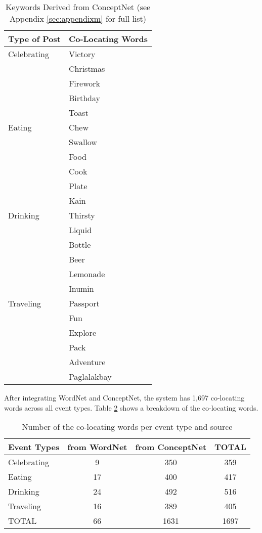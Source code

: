 \begin{table}[ph!]   %
	\centering
	\caption{Keywords Derived from ConceptNet (see Appendix \ref{sec:appendixm} for full list)} \vspace{0.25em}
	\begin{tabular}{|p{1.5in}|p{2in}|} \hline
		\centering Type of Post & Co-Locating Words \\ \hline
		Celebrating 
			& Victory \\ 
			& Christmas \\ 
			& Firework \\ 
			& Birthday \\ 
			& Toast \\\hline
		Eating  
			& Chew \\ 
			& Swallow \\ 
			& Food \\ 
			& Cook \\ 
			& Plate \\ 
			& Kain \\\hline

		Drinking 
			& Thirsty \\ 
			& Liquid \\
			& Bottle \\ 
			& Beer \\ 
			& Lemonade \\ 
			& Inumin \\\hline
		Traveling 
			& Passport \\ 
			& Fun \\ 
			& Explore \\ 
			& Pack \\ 
			& Adventure \\ 
			& Paglalakbay  \\\hline
	\end{tabular}
	\label{tab:EventClassificationConceptNet}
\end{table}

After integrating WordNet and ConceptNet, the system has 1,697 co-locating words across all event types. Table \ref{tab:Co-locatingWords} shows a breakdown of the co-locating words.
\begin{table}[ph!]   %
	\centering
	\caption{Number of the co-locating words per event type and source} \vspace{0.25em}
	\begin{tabular}{|p{1in}|c|c|c|} \hline
		\centering Event Types & from WordNet & from ConceptNet & TOTAL \\ \hline
		Celebrating & 9 & 350 & 359 \\ \hline
		Eating & 17 & 400 & 417 \\ \hline
		Drinking & 24 & 492 & 516 \\ \hline
		Traveling & 16 & 389 & 405 \\ \hline
		TOTAL & 66 & 1631 & 1697 \\ \hline
	\end{tabular}
	\label{tab:Co-locatingWords}
\end{table}

